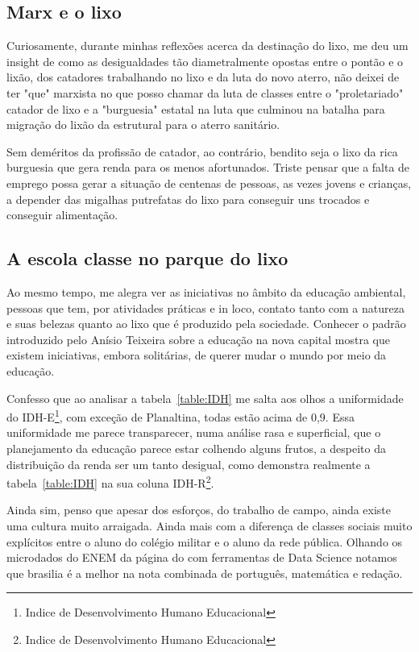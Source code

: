 \subsection{Marx e o lixo}

Curiosamente, durante minhas reflexões acerca da destinação do lixo, me deu um insight de como as desigualdades tão diametralmente opostas entre o pontão e o lixão, dos catadores trabalhando no lixo e da luta do novo aterro, não deixei de ter "que" marxista no que posso chamar da luta de classes entre o "proletariado" catador de lixo e a "burguesia" estatal na luta que culminou na batalha para migração do lixão da estrutural para o aterro sanitário.

Sem deméritos da profissão de catador, ao contrário, bendito seja o lixo da rica burguesia que gera renda para os menos afortunados. Triste pensar que a falta de emprego possa gerar a situação de centenas de pessoas, as vezes jovens e crianças, a depender das migalhas putrefatas do lixo para conseguir uns trocados e conseguir alimentação.




\subsection{A escola classe no parque do lixo}

Ao mesmo tempo, me alegra ver as iniciativas no âmbito da educação ambiental, pessoas que tem, por atividades práticas e in loco, contato tanto com a natureza e suas belezas quanto ao lixo que é produzido pela sociedade.
Conhecer o padrão introduzido pelo Anísio Teixeira sobre a educação na nova capital mostra que existem iniciativas, embora solitárias, de querer mudar o mundo por meio da educação.

Confesso que ao analisar a tabela~\ref{table:IDH} me salta aos olhos a uniformidade do IDH-E\footnote{Indice de Desenvolvimento Humano Educacional}, com exceção de Planaltina, todas estão acima de 0,9.
Essa uniformidade me parece transparecer, numa análise rasa e superficial, que o planejamento da educação parece estar colhendo alguns frutos, a despeito da distribuição da renda ser um tanto desigual, como demonstra realmente a tabela~\ref{table:IDH} na sua coluna IDH-R\footnote{Indice de Desenvolvimento Humano Educacional}.

Ainda sim, penso que apesar dos esforços, do trabalho de campo, ainda existe uma cultura muito arraigada. Ainda mais com a diferença de classes sociais muito explícitos entre o aluno do colégio militar e o aluno da rede pública. Olhando os microdados do ENEM da página do  com ferramentas de Data Science notamos que brasilia é a melhor na nota combinada de português, matemática e redação.



